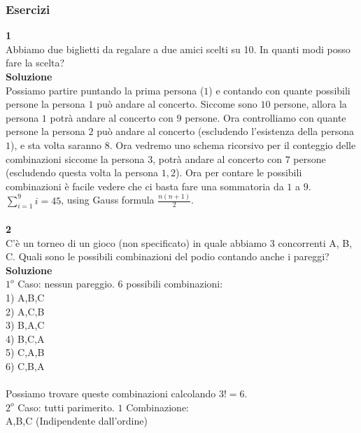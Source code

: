 \documentclass[11pt]{article}
\begin{document}
        \subsubsection{Esercizi}
            \textbf{\large 1}\\
            Abbiamo due biglietti da regalare a due amici scelti su 10. In quanti modi posso fare la scelta?
            \\
            \textbf{\large Soluzione}\\
            Possiamo partire puntando la prima persona ($1$) e contando con quante possibili persone la persona $1$ può andare al concerto. Siccome sono $10$ persone, allora la persona $1$ potrà andare al concerto con $9$ persone.
            Ora controlliamo con quante persone la persona $2$ può andare al concerto (escludendo l'esistenza della persona $1$), e sta volta saranno $8$.
            Ora vedremo uno schema ricorsivo per il conteggio delle combinazioni siccome la persona $3$, potrà andare al concerto con $7$ persone (escludendo questa volta la persona $1, 2$).
            Ora per contare le possibili combinazioni \`e facile vedere che ci basta fare una sommatoria da $1$ a $9$.
            \\    
            $\sum_{i=1}^{9}i = 45$, using Gauss formula $\frac{n(n+1)}{2}$.
            \\
            \\
            \textbf{\large 2}\\
            C'è un torneo di un gioco (non specificato) in quale abbiamo 3 concorrenti A, B, C. Quali sono le possibili combinazioni del podio contando anche i pareggi?
            \\
            \textbf{\large Soluzione}\\
            $1^o$ Caso: nessun pareggio. 6 possibili combinazioni:\\
            1) A,B,C\\
            2) A,C,B\\
            3) B,A,C\\
            4) B,C,A\\
            5) C,A,B\\
            6) C,B,A\\
            \\
            Possiamo trovare queste combinazioni calcolando $3! = 6$.\\
            $2^o$ Caso: tutti parimerito. $1$ Combinazione:\\
            A,B,C (Indipendente dall'ordine)\\
\end{document}
